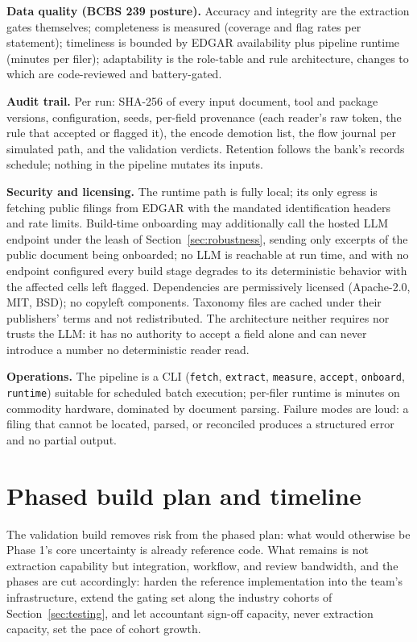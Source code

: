 \documentclass[11pt]{article}
\newcommand{\lead}[2]{\par\addvspace{5pt}\textbf{\textcolor{#1}{#2}}}
\begin{document}
\lead{navytwo}{Data quality (BCBS 239 posture).} Accuracy and integrity are the extraction gates themselves; completeness is measured (coverage and flag rates per statement); timeliness is bounded by EDGAR availability plus pipeline runtime (minutes per filer); adaptability is the role-table and rule architecture, changes to which are code-reviewed and battery-gated.

\lead{navytwo}{Audit trail.} Per run: SHA-256 of every input document, tool and package versions, configuration, seeds, per-field provenance (each reader's raw token, the rule that accepted or flagged it), the encode demotion list, the flow journal per simulated path, and the validation verdicts. Retention follows the bank's records schedule; nothing in the pipeline mutates its inputs.

\lead{navytwo}{Security and licensing.} The runtime path is fully local; its only egress is fetching public filings from EDGAR with the mandated identification headers and rate limits. Build-time onboarding may additionally call the hosted LLM endpoint under the leash of Section~\ref{sec:robustness}, sending only excerpts of the public document being onboarded; no LLM is reachable at run time, and with no endpoint configured every build stage degrades to its deterministic behavior with the affected cells left flagged. Dependencies are permissively licensed (Apache-2.0, MIT, BSD); no copyleft components. Taxonomy files are cached under their publishers' terms and not redistributed. The architecture neither requires nor trusts the LLM: it has no authority to accept a field alone and can never introduce a number no deterministic reader read.

\lead{navytwo}{Operations.} The pipeline is a CLI (\texttt{fetch}, \texttt{extract}, \texttt{measure}, \texttt{accept}, \texttt{onboard}, \texttt{runtime}) suitable for scheduled batch execution; per-filer runtime is minutes on commodity hardware, dominated by document parsing. Failure modes are loud: a filing that cannot be located, parsed, or reconciled produces a structured error and no partial output.

\section{Phased build plan and timeline}
\label{sec:plan}
The validation build removes risk from the phased plan: what would otherwise be Phase 1's core uncertainty is already reference code. What remains is not extraction capability but integration, workflow, and review bandwidth, and the phases are cut accordingly: harden the reference implementation into the team's infrastructure, extend the gating set along the industry cohorts of Section~\ref{sec:testing}, and let accountant sign-off capacity, never extraction capacity, set the pace of cohort growth.
\end{document}

